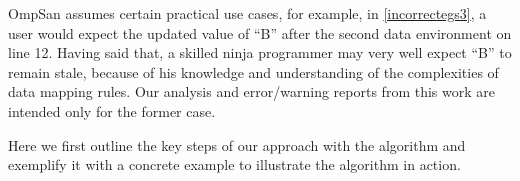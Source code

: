 % 
OmpSan assumes certain practical use cases, for example, in \autoref{incorrectegs3}, a user would expect the updated 
value of ``B'' after the second data environment on line 12. 
Having said that, a skilled ninja programmer 
may very well expect ``B'' to remain stale, because of his knowledge 
and understanding of the complexities of data mapping rules. 
Our analysis and error/warning reports from this work are 
intended only for the former case.

Here we first outline the key steps of our approach with the algorithm
and exemplify it with a concrete example
to illustrate the algorithm in action.
\vspace{-10pt}

